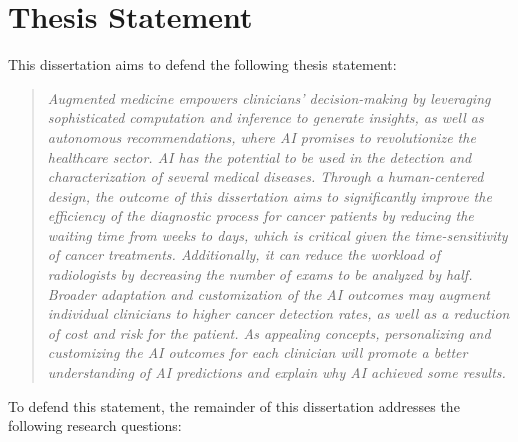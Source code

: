 \section{Thesis Statement}
\label{sec:chap001003}

\noindent
This dissertation aims to defend the following thesis statement:

\begin{quote}
{\it
Augmented medicine empowers clinicians' decision-making by leveraging sophisticated computation and inference to generate insights, as well as autonomous recommendations, where \ac{AI} promises to revolutionize the healthcare sector.
\ac{AI} has the potential to be used in the detection and characterization of several medical diseases.
Through a human-centered design, the outcome of this dissertation aims to significantly improve the efficiency of the diagnostic process for cancer patients by reducing the waiting time from weeks to days, which is critical given the time-sensitivity of cancer treatments.
Additionally, it can reduce the workload of radiologists by decreasing the number of exams to be analyzed by half.
Broader adaptation and customization of the \ac{AI} outcomes may augment individual clinicians to higher cancer detection rates, as well as a reduction of cost and risk for the patient.
As appealing concepts, personalizing and customizing the \ac{AI} outcomes for each clinician will promote a better understanding of \ac{AI} predictions and explain why \ac{AI} achieved some results.
}
\end{quote}

\noindent
To defend this statement, the remainder of this dissertation addresses the following research questions:

